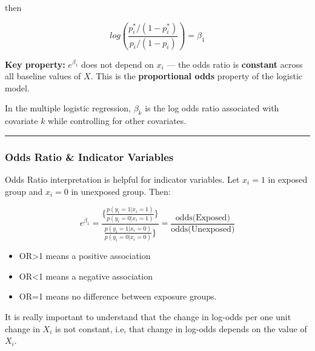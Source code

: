\documentclass[
  letterpaper,
  DIV=11,
  numbers=noendperiod]{scrreprt}
\begin{document}
then

\[
log\left(\frac{p^*_i/(1-p^*_i)}{p_i/(1-p_i)}\right) = \beta_1
\]

\begin{tcolorbox}[enhanced jigsaw, rightrule=.15mm, breakable, left=2mm, colframe=quarto-callout-note-color-frame, opacityback=0, leftrule=.75mm, toprule=.15mm, colback=white, arc=.35mm, bottomrule=.15mm]

\textbf{Key property:} \(e^{\beta_1}\) does not depend on \(x_i\) ---
the odds ratio is \textbf{constant} across all baseline values of \(X\).
This is the \textbf{proportional odds} property of the logistic model.

\end{tcolorbox}

In the multiple logistic regression, \(\beta_k\) is the log odds ratio
associated with covariate \(k\) while controlling for other covariates.

\begin{center}\rule{0.5\linewidth}{0.5pt}\end{center}

\hypertarget{odds-ratio-indicator-variables}{%
\subsubsection*{Odds Ratio \& Indicator
Variables}\label{odds-ratio-indicator-variables}}

Odds Ratio interpretation is helpful for indicator variables. Let
\(x_i=1\) in exposed group and \(x_i=0\) in unexposed group. Then:

\[
e^{\beta_1} = \frac{\{\frac{p(y_i=1|x_i=1)}{p(y_i=0|x_i=1)}\}}{\frac{p(y_i=1|x_i=0)}{p(y_i=0|x_i=0)}\}} = \frac{\text{odds(Exposed)}}{\text{odds(Unexposed)}}
\]

\begin{itemize}
\item
  OR\textgreater1 means a positive association
\item
  OR\textless1 means a negative association
\item
  OR=1 means no difference between exposure groups.
\end{itemize}

It is really important to understand that the change in log-odds per one
unit change in \(X_i\) is not constant, i.e, that change in log-odds
depends on the value of \(X_i\).
\end{document}
